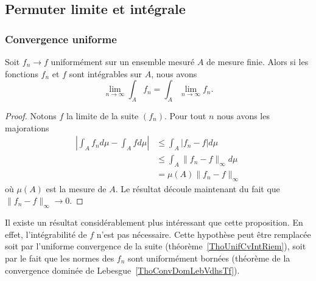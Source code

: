 \subsection{Permuter limite et intégrale}

\subsubsection{Convergence uniforme}

\begin{proposition}       \label{PropbhKnth}
	Soit \( f_n\to f\) uniformément sur un ensemble mesuré \( A\) de mesure finie. Alors si les fonctions \( f_n\) et \( f\) sont intégrables sur \( A\), nous avons
	\begin{equation}
		\lim_{n\to \infty} \int_A f_n=\int_A \lim_{n\to \infty} f_n.
	\end{equation}
\end{proposition}

\begin{proof}
	Notons \( f\) la limite de la suite \( (f_n)\). Pour tout \( n\) nous avons les majorations
	\begin{subequations}
		\begin{align}
			\left| \int_A f_n d\mu-\int_A fd\mu \right| & \leq \int_A| f_n-f |d\mu             \\
			                                            & \leq \int_A \| f_n-f \|_{\infty}d\mu \\
			                                            & =\mu(A)\| f_n-f \|_{\infty}
		\end{align}
	\end{subequations}
	où \( \mu(A)\) est la mesure de \( A\). Le résultat découle maintenant du fait que \( \| f_n-f \|_{\infty}\to 0\).
\end{proof}
Il existe un résultat considérablement plus intéressant que cette proposition. En effet, l'intégrabilité de \( f\) n'est pas nécessaire. Cette hypothèse peut être remplacée soit par l'uniforme convergence de la suite (théorème~\ref{ThoUnifCvIntRiem}), soit par le fait que les normes des \( f_n\) sont uniformément bornées (théorème de la convergence dominée de Lebesgue~\ref{ThoConvDomLebVdhsTf}).

